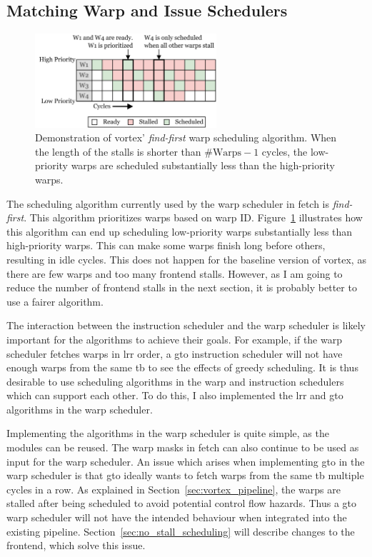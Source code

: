 \subsection{Matching Warp and Issue Schedulers} \label{sec:warp_issue_scheduler}

\begin{figure}
    \centering
    \includegraphics[width=0.6\textwidth]{figures/find-first-scheduling-2.png}
    \caption[Demonstration of \Gls{vortex}' find-first warp scheduler.]{Demonstration of \Gls{vortex}' \textit{find-first} warp scheduling algorithm. When the length of the stalls is shorter than $\text{\#Warps} - 1$ cycles, the low-priority warps are scheduled substantially less than the high-priority warps.}
    \label{fig:find_first_scheduling}
\end{figure}

The scheduling algorithm currently used by the warp scheduler in fetch is \textit{find-first}. This algorithm prioritizes warps based on warp ID. Figure~\ref{fig:find_first_scheduling} illustrates how this algorithm can end up scheduling low-priority warps substantially less than high-priority warps. This can make some warps finish long before others, resulting in idle cycles. This does not happen for the baseline version of \Gls{vortex}, as there are few warps and too many frontend stalls. However, as I am going to reduce the number of frontend stalls in the next section, it is probably better to use a fairer algorithm.

The interaction between the instruction scheduler and the warp scheduler is likely important for the algorithms to achieve their goals. For example, if the warp scheduler fetches warps in \acrshort{lrr} order, a \acrshort{gto} instruction scheduler will not have enough warps from the same \acrshort{tb} to see the effects of greedy scheduling. It is thus desirable to use scheduling algorithms in the warp and instruction schedulers which can support each other. To do this, I also implemented the \acrshort{lrr} and \acrshort{gto} algorithms in the warp scheduler.

Implementing the algorithms in the warp scheduler is quite simple, as the modules can be reused. The warp masks in fetch can also continue to be used as input for the warp scheduler. An issue which arises when implementing \acrshort{gto} in the warp scheduler is that \acrshort{gto} ideally wants to fetch warps from the same \acrshort{tb} multiple cycles in a row. As explained in Section~\ref{sec:vortex_pipeline}, the warps are stalled after being scheduled to avoid potential control flow hazards. Thus a \acrshort{gto} warp scheduler will not have the intended behaviour when integrated into the existing pipeline. Section~\ref{sec:no_stall_scheduling} will describe changes to the frontend, which solve this issue.

